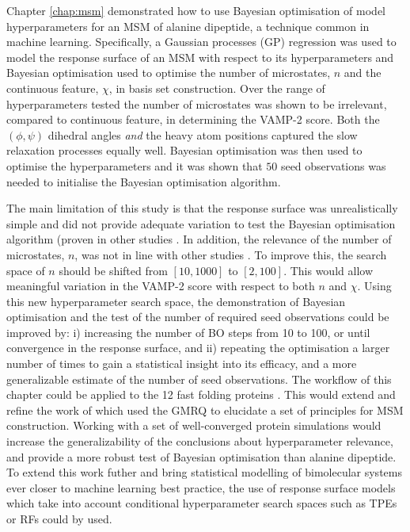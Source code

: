 Chapter \ref{chap:msm} demonstrated how to use Bayesian optimisation of model hyperparameters for an MSM of alanine dipeptide, a technique common in machine learning. Specifically, a Gaussian processes (GP) regression was used to model the response surface of an MSM with respect to its hyperparameters and Bayesian optimisation used to optimise the number of microstates, $n$ and the continuous feature, $\chi$, in basis set construction. Over the range of hyperparameters tested the number of microstates was shown to be irrelevant, compared to continuous feature, in determining the VAMP-2 score. Both the $(\phi, \psi)$ dihedral angles \emph{and} the heavy atom positions captured the slow relaxation processes equally well. Bayesian optimisation was then used to optimise the hyperparameters and it was shown that $50$ seed observations was needed to initialise the Bayesian optimisation algorithm. 

The main limitation of this study is that the response surface was unrealistically simple and did not provide adequate variation to test the Bayesian optimisation algorithm (proven in other studies \cite{bergstraAlgorithmsHyperParameterOptimizationa}\cite{bergstrajamesbergstraRandomSearchHyperParameter2012}.  In addition, the relevance of the number of microstates, $n$, was not in line with other studies \cite{mcgibbonStatisticalModelSelection2014a}\cite{wuVariationalApproachLearning2020c}\cite{mcgibbonVariationalCrossvalidationSlow2015}. To improve this,  the search space of $n$ should be shifted from $[10, 1000]$ to $[2, 100]$. This would allow meaningful variation in the VAMP-2 score with respect to both $n$ and $\chi$.  Using this new hyperparameter search space, the demonstration of Bayesian optimisation and the test of the number of required seed observations could be improved by: i) increasing the number of BO steps from \num{10} to \num{100}, or until convergence in the response surface, and ii) repeating the optimisation a larger number of times to gain a statistical insight into its efficacy, and a more generalizable estimate of the number of seed observations. The workflow of this chapter could be applied to the 12 fast folding proteins  \cite{lindorff-larsenHowFastFoldingProteins2011a}. This would extend and refine the work of \cite{husicOptimizedParameterSelection2016} which used the GMRQ to elucidate a set of principles for MSM construction. Working with a set of well-converged protein simulations would increase the generalizability of the conclusions about hyperparameter relevance, and provide a more robust test of Bayesian optimisation than alanine dipeptide.  To extend this work futher and bring statistical modelling of bimolecular systems ever closer to machine learning best practice, the use of response surface models which take into account conditional hyperparameter search spaces such as TPEs or RFs could by used.

